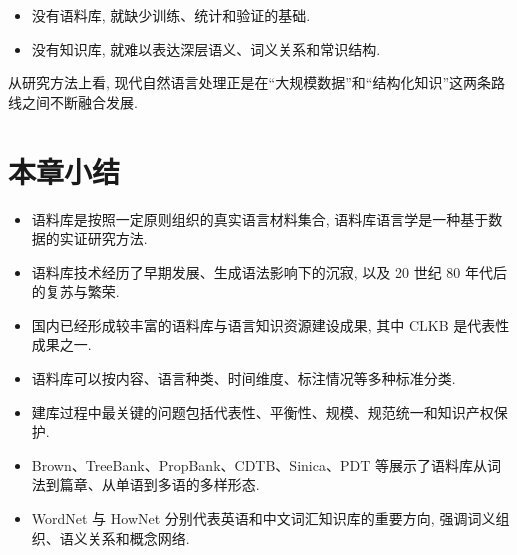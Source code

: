 \begin{itemize}
\item 没有语料库, 就缺少训练、统计和验证的基础.
\item 没有知识库, 就难以表达深层语义、词义关系和常识结构.
\end{itemize}

从研究方法上看, 现代自然语言处理正是在“大规模数据”和“结构化知识”这两条路线之间不断融合发展.

\section{本章小结}


\begin{itemize}
\item 语料库是按照一定原则组织的真实语言材料集合, 语料库语言学是一种基于数据的实证研究方法.
\item 语料库技术经历了早期发展、生成语法影响下的沉寂, 以及 20 世纪 80 年代后的复苏与繁荣.
\item 国内已经形成较丰富的语料库与语言知识资源建设成果, 其中 CLKB 是代表性成果之一.
\item 语料库可以按内容、语言种类、时间维度、标注情况等多种标准分类.
\item 建库过程中最关键的问题包括代表性、平衡性、规模、规范统一和知识产权保护.
\item Brown、TreeBank、PropBank、CDTB、Sinica、PDT 等展示了语料库从词法到篇章、从单语到多语的多样形态.
\item WordNet 与 HowNet 分别代表英语和中文词汇知识库的重要方向, 强调词义组织、语义关系和概念网络.
\end{itemize}
